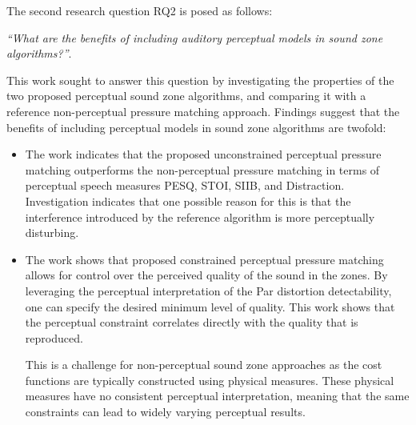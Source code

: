 The second research question RQ2 is posed as follows:
\begin{center}
    {\textit{``What are the benefits of including auditory perceptual models in sound zone algorithms?''}}.\\
\end{center}
This work sought to answer this question by investigating the properties of the two proposed perceptual sound zone 
algorithms, and comparing it with a reference non-perceptual pressure matching approach.
Findings suggest that the benefits of including perceptual models in sound zone algorithms are twofold:
\begin{itemize}
    \item The work indicates that the proposed unconstrained perceptual pressure matching outperforms 
        the non-perceptual pressure matching in terms of perceptual speech measures PESQ, STOI, SIIB, and Distraction.
        Investigation indicates that one possible reason for this is that the interference introduced by the reference algorithm is more perceptually disturbing.
    \item The work shows that proposed constrained perceptual pressure matching allows for control over the perceived quality of the sound in the zones.
        By leveraging the perceptual interpretation of the Par distortion detectability, one can specify the desired minimum
        level of quality.
        This work shows that the perceptual constraint correlates directly with the quality that is reproduced.

        This is a challenge for non-perceptual sound zone approaches as the cost functions are typically constructed
        using physical measures.
        These physical measures have no consistent perceptual interpretation, meaning that the same constraints can lead to widely varying perceptual results.
\end{itemize}
